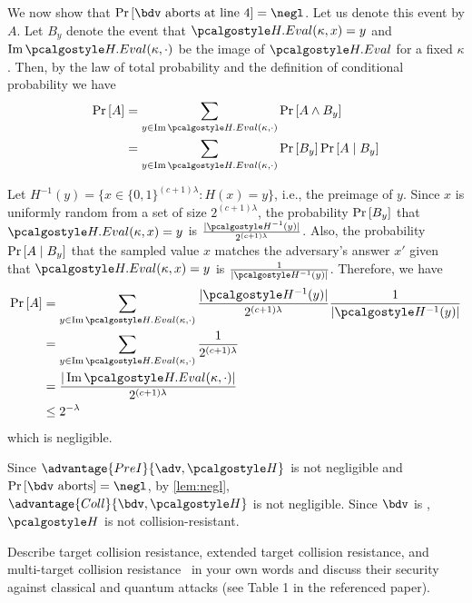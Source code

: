 \begin{mysolution}
  We now show that $\pr{\bdv \text{ aborts at line 4} } = \negl$.
  Let us denote this event by $A$.
  Let $B_y$ denote the event that $\algo{H.Eval}(\kappa, x) = y$ and $\Ima \algo{H.Eval}(\kappa, \cdot)$ be the image of $\algo{H.Eval}$ for a fixed $\kappa$.
  Then, by the law of total probability and the definition of conditional probability we have
  \begin{align*}
    \pr{A} &= \sum_{y \in \Ima \algo{H.Eval}(\kappa, \cdot)} \pr{A \wedge B_y} \\
           &= \sum_{y \in \Ima \algo{H.Eval}(\kappa, \cdot)} \pr{B_y} \pr{A \mid B_y}
  \end{align*}
  
  Let $H^{-1}(y) = \{x \in \{0, 1\}^{(c+1)\lambda} : H(x) = y\}$, i.e., the preimage of $y$.
  Since $x$ is uniformly random from a set of size $2^{(c+1)\lambda}$, the probability $\Pr\left[ B_y \right]$ that $\algo{H.Eval}(\kappa, x) = y$ is $\frac{|\algo{H}^{-1}(y)|} {2^{(c+1)\lambda}}$.
  Also, the probability $\Pr\left[ A \mid B_y \right]$ that the sampled value $x$ matches the adversary's answer $x'$ given that $\algo{H.Eval}(\kappa, x) = y$ is $\frac{1}{|\algo{H}^{-1}(y)|}$.
  Therefore, we have
  \begin{align*}
    \pr{A} &= \sum_{y \in \Ima \algo{H.Eval}(\kappa, \cdot)} \frac{|\algo{H}^{-1}(y)|} {2^{(c+1)\lambda}} \frac{1}{|\algo{H}^{-1}(y)|}  \\
           &= \sum_{y \in \Ima \algo{H.Eval}(\kappa, \cdot)} \frac{1} {2^{(c+1)\lambda}} \\
           &= \frac{|\Ima \algo{H.Eval}(\kappa, \cdot)|} {2^{(c+1)\lambda}} \\
           &\le 2^{-\lambda} \\
  \end{align*}
  which is negligible.
  
  Since $\advantage{PreI}{\adv, \algo{H}}$ is not negligible and $\pr{\bdv \text{ aborts}} = \negl$, by \cref{lem:negl}, $\advantage{Coll}{\bdv, \algo{H}}$ is not negligible.
  Since $\bdv$ is \ppt, $\algo{H}$ is not collision-resistant.
\end{mysolution}
\fi

\begin{exercise}[Optional]
  Describe target collision resistance, extended target collision resistance, and multi-target collision resistance~\cite{PKC:HulRijSon16} in your own words and discuss their security against classical and quantum attacks (see Table 1 in the referenced paper).
\end{exercise}


